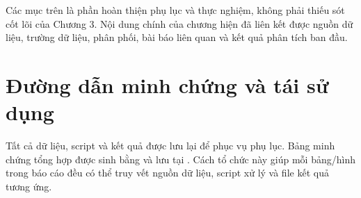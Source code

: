 Các mục trên là phần hoàn thiện phụ lục và thực nghiệm, không phải thiếu sót cốt lõi của Chương 3. Nội dung chính của chương hiện đã liên kết được nguồn dữ liệu, trường dữ liệu, phân phối, bài báo liên quan và kết quả phân tích ban đầu.

\section{Đường dẫn minh chứng và tái sử dụng}

Tất cả dữ liệu, script và kết quả được lưu lại để phục vụ phụ lục. Bảng minh chứng tổng hợp được sinh bằng  và lưu tại . Cách tổ chức này giúp mỗi bảng/hình trong báo cáo đều có thể truy vết nguồn dữ liệu, script xử lý và file kết quả tương ứng.

